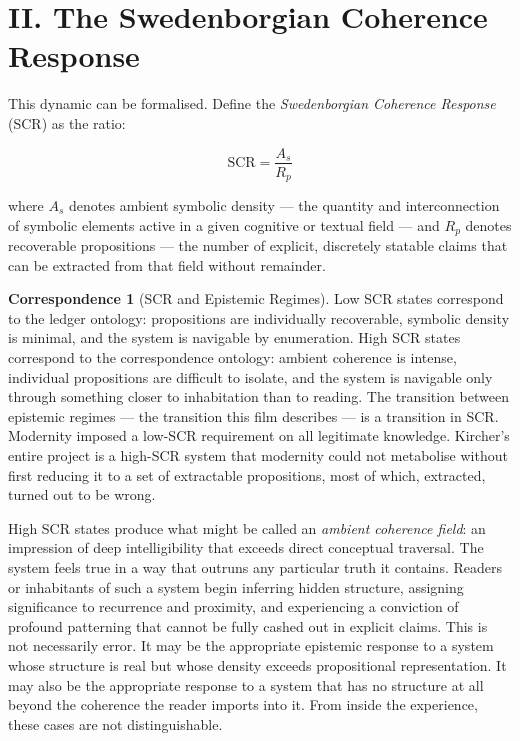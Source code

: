 \documentclass[12pt, a4paper, twoside]{memoir}
\theoremstyle{definition}
\newtheorem{correspondence}{Correspondence}[chapter]
\theoremstyle{remark}
\begin{document}
\section*{II. The Swedenborgian Coherence Response}

This dynamic can be formalised. Define the \textit{Swedenborgian Coherence Response} (SCR) as the ratio:

\[
\mathrm{SCR} = \frac{A_s}{R_p}
\]

where $A_s$ denotes ambient symbolic density --- the quantity and interconnection of symbolic elements active in a given cognitive or textual field --- and $R_p$ denotes recoverable propositions --- the number of explicit, discretely statable claims that can be extracted from that field without remainder.

\begin{correspondence}[SCR and Epistemic Regimes]
Low SCR states correspond to the ledger ontology: propositions are individually recoverable, symbolic density is minimal, and the system is navigable by enumeration. High SCR states correspond to the correspondence ontology: ambient coherence is intense, individual propositions are difficult to isolate, and the system is navigable only through something closer to inhabitation than to reading. The transition between epistemic regimes --- the transition this film describes --- is a transition in SCR. Modernity imposed a low-SCR requirement on all legitimate knowledge. Kircher's entire project is a high-SCR system that modernity could not metabolise without first reducing it to a set of extractable propositions, most of which, extracted, turned out to be wrong.
\end{correspondence}

High SCR states produce what might be called an \textit{ambient coherence field}: an impression of deep intelligibility that exceeds direct conceptual traversal. The system feels true in a way that outruns any particular truth it contains. Readers or inhabitants of such a system begin inferring hidden structure, assigning significance to recurrence and proximity, and experiencing a conviction of profound patterning that cannot be fully cashed out in explicit claims. This is not necessarily error. It may be the appropriate epistemic response to a system whose structure is real but whose density exceeds propositional representation. It may also be the appropriate response to a system that has no structure at all beyond the coherence the reader imports into it. From inside the experience, these cases are not distinguishable.
\end{document}

